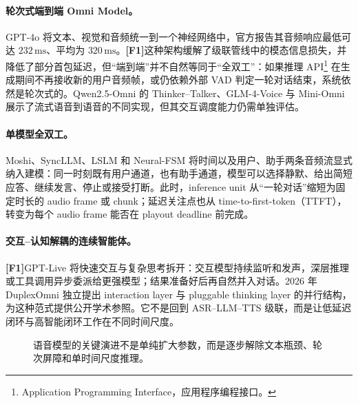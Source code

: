 \documentclass[UTF8,fontset=none,a4paper,10pt]{ctexart}
\newcommand{\FOne}{\textcolor{official}{\textbf{[F1]}}}
\newcommand{\ms}{\,\mathrm{ms}}
\begin{document}
\paragraph{轮次式端到端 Omni Model。}
GPT-4o 将文本、视觉和音频统一到一个神经网络中，官方报告其音频响应最低可达 $232\ms$、平均为 $320\ms$\cite{zh:openai2024gpt4osystemcard}。\FOne 这种架构缓解了级联管线中的模态信息损失，并降低了部分首包延迟，但“端到端”并不自然等同于“全双工”：如果推理 API\footnote{Application Programming Interface，应用程序编程接口。} 在生成期间不再接收新的用户音频帧，或仍依赖外部 VAD 判定一轮对话结束，系统依然是轮次式的。Qwen2.5-Omni 的 Thinker--Talker、GLM-4-Voice 与 Mini-Omni 展示了流式语音到语音的不同实现\cite{zh:xu2025qwenomni,zh:zeng2024glm4voice,zh:xie2024miniomni}，但其交互调度能力仍需单独评估。

\paragraph{单模型全双工。}
Moshi、SyncLLM、LSLM 和 Neural-FSM 将时间以及用户、助手两条音频流显式纳入建模：同一时刻既有用户通道，也有助手通道，模型可以选择静默、给出简短应答、继续发言、停止或接受打断\cite{zh:defossez2024moshi,zh:veluri2024syncllm,zh:ma2025lslm,zh:wang2024neuralfsm}。此时，inference unit 从“一轮对话”缩短为固定时长的 audio frame 或 chunk；延迟关注点也从 time-to-first-token（TTFT），转变为每个 audio frame 能否在 playout deadline 前完成。

\paragraph{交互--认知解耦的连续智能体。}
\FOne GPT-Live 将快速交互与复杂思考拆开：交互模型持续监听和发声，深层推理或工具调用异步委派给更强模型；结果准备好后再自然并入对话\cite{zh:openai2026gptlive,zh:openai2026continuous}。2026 年 DuplexOmni 独立提出 interaction layer 与 pluggable thinking layer 的并行结构\cite{zh:huang2026duplexomni}，为这种范式提供公开学术参照。它不是回到 ASR--LLM--TTS 级联，而是让低延迟闭环与高智能闭环工作在不同时间尺度。

\begin{figure}[H]
\centering
{}
\caption{语音模型的关键演进不是单纯扩大参数，而是逐步解除文本瓶颈、轮次屏障和单时间尺度推理。}
\label{zh:fig:evolution}
\end{figure}
\end{document}
